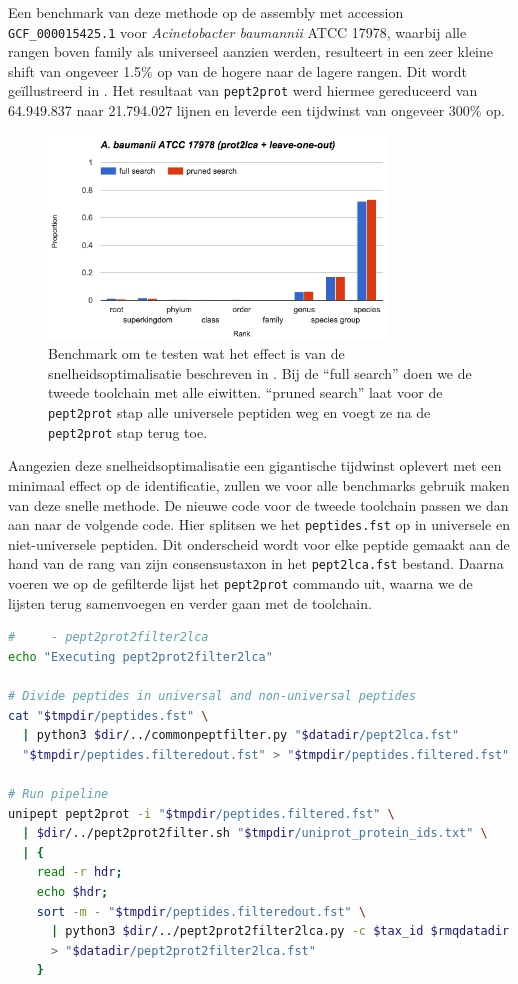 Een benchmark van deze methode op de assembly met accession
\texttt{GCF\_000015425.1} voor \textit{Acinetobacter baumannii} ATCC 17978,
waarbij alle rangen boven family als universeel aanzien werden, resulteert in
een zeer kleine shift van ongeveer 1.5\% op van de hogere naar de lagere rangen.
Dit wordt geïllustreerd in . Het resultaat van
\texttt{pept2prot} werd hiermee gereduceerd van 64.949.837 naar 21.794.027
lijnen en leverde een tijdwinst van ongeveer 300\% op.

\begin{figure}
	\centering
	\includegraphics[width=0.8\textwidth]{includes/leaveoneout}
	\caption{Benchmark om te testen wat het effect is van de 
	snelheidsoptimalisatie beschreven in . Bij 
	de ``full search'' doen we de tweede toolchain met alle eiwitten. ``pruned 
	search'' laat voor de \texttt{pept2prot} stap alle universele peptiden weg  
	en voegt ze na de \texttt{pept2prot} stap terug toe.}
	\label{fig:leaveoneout}
\end{figure}

Aangezien deze snelheidsoptimalisatie een gigantische tijdwinst oplevert met een
minimaal effect op de identificatie, zullen we voor alle benchmarks gebruik
maken van deze snelle methode. De nieuwe code voor de tweede toolchain passen we
dan aan naar de volgende code. Hier splitsen we het \texttt{peptides.fst} op in
universele en niet-universele peptiden. Dit onderscheid wordt voor elke peptide
gemaakt aan de hand van de rang van zijn consensustaxon in het
\texttt{pept2lca.fst} bestand. Daarna voeren we op de gefilterde lijst het
\texttt{pept2prot} commando uit, waarna we de lijsten terug samenvoegen en
verder gaan met de toolchain.

\begin{lstlisting}[language=Bash, firstnumber=72]
#     - pept2prot2filter2lca
echo "Executing pept2prot2filter2lca"

# Divide peptides in universal and non-universal peptides
cat "$tmpdir/peptides.fst" \
  | python3 $dir/../commonpeptfilter.py "$datadir/pept2lca.fst" 
  "$tmpdir/peptides.filteredout.fst" > "$tmpdir/peptides.filtered.fst"

# Run pipeline
unipept pept2prot -i "$tmpdir/peptides.filtered.fst" \
  | $dir/../pept2prot2filter.sh "$tmpdir/uniprot_protein_ids.txt" \
  | {
    read -r hdr;
    echo $hdr;
    sort -m - "$tmpdir/peptides.filteredout.fst" \
      | python3 $dir/../pept2prot2filter2lca.py -c $tax_id $rmqdatadir \
      > "$datadir/pept2prot2filter2lca.fst"
    }
\end{lstlisting}

